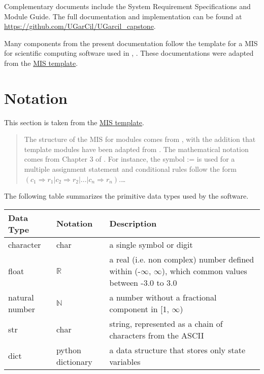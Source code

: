 \documentclass[12pt, titlepage]{article}
\begin{document}
Complementary documents include the System Requirement Specifications
and Module Guide.  The full documentation and implementation can be
found at \url{https://github.com/UGarCil/UGarcil_capstone}.

Many components from the present documentation follow the template
 for a MIS for scientific computing software used in \cite{patel2023module}, 
 \cite{bicket2017module}. These documentations were adapted from the \href{https://website-url.com/mis-template}{MIS template}.

 \section{Notation}



This section is taken from the \href{https://website-url.com/mis-template}{MIS template}.

\begin{quote}
The structure of the MIS for modules comes from \citet{HoffmanAndStrooper1995},
with the addition that template modules have been adapted from
\cite{GhezziEtAl2003}.  The mathematical notation comes from Chapter 3 of
\citet{HoffmanAndStrooper1995}.  For instance, the symbol := is used for a
multiple assignment statement and conditional rules follow the form $(c_1
\Rightarrow r_1 | c_2 \Rightarrow r_2 | ... | c_n \Rightarrow r_n )$.\dots
\end{quote}

The following table summarizes the primitive data types used by the \progname software. 

\begin{center}
\renewcommand{\arraystretch}{1.2}
\noindent 
\begin{tabular}{l l p{7.5cm}} 
\toprule 
\textbf{Data Type} & \textbf{Notation} & \textbf{Description}\\ 
\midrule
character & char & a single symbol or digit\\
float & $\mathbb{R}$ & a real (i.e. non complex) number defined within (-$\infty$, $\infty$), which common values between -3.0 to 3.0 \\
natural number & $\mathbb{N}$ & a number without a fractional component in [1, $\infty$) \\
str & char & string, represented as a chain of characters from the ASCII \\
dict & python dictionary & a data structure that stores only state variables \\
\bottomrule
\end{tabular} 
\end{center}
\end{document}
